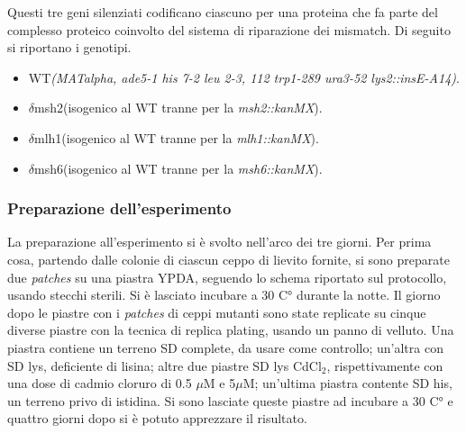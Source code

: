 	Questi tre geni silenziati codificano ciascuno per una proteina che fa parte del complesso proteico coinvolto del sistema di riparazione dei mismatch. 
	Di seguito si riportano i genotipi. 
	\begin{itemize}
		\item WT\emph{(MATalpha, ade5-1 his 7-2 leu 2-3, 112 trp1-289 ura3-52 lys2::insE-A14)}.
		\item $\delta$msh2(isogenico al WT tranne per la \emph{msh2::kanMX}).
		\item $\delta$mlh1(isogenico al WT tranne per la \emph{mlh1::kanMX}).
		\item $\delta$msh6(isogenico al WT tranne per la \emph{msh6::kanMX}).
	\end{itemize}
 
 
\subsubsection*{Preparazione dell'esperimento}
La preparazione all'esperimento si è svolto nell'arco dei tre giorni. 
Per prima cosa, partendo dalle colonie di ciascun ceppo di lievito fornite, si sono preparate due \emph{patches} su una piastra YPDA, seguendo lo schema riportato sul protocollo, usando stecchi sterili. 
Si è lasciato incubare a 30 C° durante la notte. 
Il giorno dopo le piastre con i \emph{patches} di ceppi mutanti sono state replicate su cinque diverse piastre con la tecnica di replica plating, usando un panno di velluto. 
Una piastra contiene un terreno SD complete, da usare come controllo; un'altra con SD lys, deficiente di lisina; altre due piastre SD lys CdCl$_{2}$, rispettivamente con una dose di cadmio cloruro di 0.5
$\mu$M e 5$\mu$M; un'ultima piastra contente SD his, un terreno privo di istidina. 
Si sono lasciate queste piastre ad incubare a 30 C° e quattro giorni dopo si è potuto apprezzare il risultato.
 
